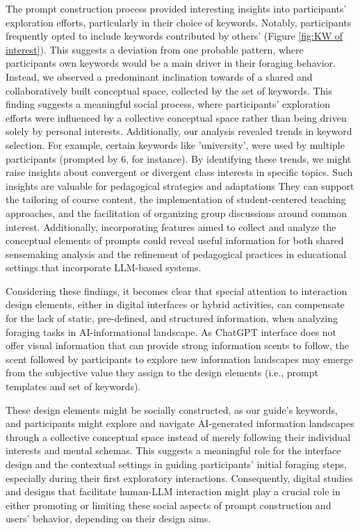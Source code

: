 \documentclass[sn-mathphys, Numbered]{sn-jnl}%
\theoremstyle{thmstyleone}%
\theoremstyle{thmstyletwo}%
\theoremstyle{thmstylethree}%
\begin{document}
The prompt construction process provided interesting insights into participants' exploration efforts, particularly in their choice of keywords. Notably, participants frequently opted to include keywords contributed by others' (Figure \ref{fig:KW of interest}). This suggests a deviation from one probable pattern, where participants own keywords would be a main driver in their foraging behavior. Instead, we observed a predominant inclination towards of a shared and collaboratively built conceptual space, collected by the set of keywords. This finding suggests a meaningful social process, where participants' exploration efforts were influenced by a collective conceptual space rather than being driven solely by personal interests.  
Additionally, our analysis revealed trends in keyword selection. For example, certain keywords like 'university', were used by multiple participants (prompted by 6, for instance). By identifying these trends, we might raise insights about convergent or divergent class interests in specific topics. Such insights are valuable for pedagogical strategies and adaptations They can support the tailoring of course content, the implementation of student-centered teaching approaches, and the facilitation of organizing group discussions around common interest. Additionally, incorporating features aimed to collect and analyze the conceptual elements of prompts could reveal useful information for both shared sensemaking analysis and the refinement of pedagogical practices in educational settings that incorporate LLM-based systems.

Considering these findings, it becomes clear that special attention to interaction design elements, either in digital interfaces or hybrid activities, can compensate for the lack of static, pre-defined, and structured information, when analyzing foraging tasks in AI-informational landscape.
As ChatGPT interface does not offer visual information that can provide strong information scents to follow, the scent followed by participants to explore new information landscapes may emerge from the subjective value they assign to the design elements (i.e., prompt templates and set of keywords).

These design elements might be socially constructed, as our guide's keywords, and participants might explore and navigate AI-generated information landscapes through a collective conceptual space instead of merely following their individual interests and mental schemas. This suggests a meaningful role for the interface design and the contextual settings in guiding participants' initial foraging steps, especially during their first exploratory interactions. Consequently, digital studies and designs that facilitate human-LLM interaction might play a crucial role in either promoting or limiting these social aspects of prompt construction and users' behavior, depending on their design aims.
\end{document}

